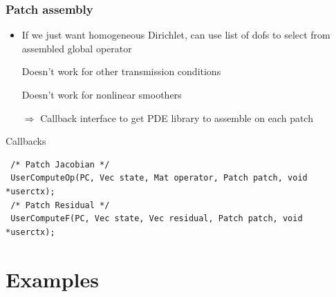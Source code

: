 \documentclass[presentation,aspectratio=43, 10pt]{beamer}
\newcommand{\xmark}{\ding{55}}
\begin{document}
\begin{frame}[fragile]
  \frametitle{Patch assembly}
  \begin{itemize}
  \item If we just want homogeneous Dirichlet, can use list of dofs to
    select from assembled global operator
  \item[\xmark] Doesn't work for other transmission conditions
  \item[\xmark] Doesn't work for nonlinear smoothers
  \item[$\Rightarrow$] Callback interface to get PDE library to
    assemble on each patch
  \end{itemize}
  \begin{block}{Callbacks}
\begin{verbatim}
 /* Patch Jacobian */
 UserComputeOp(PC, Vec state, Mat operator, Patch patch, void *userctx);
 /* Patch Residual */
 UserComputeF(PC, Vec state, Vec residual, Patch patch, void *userctx);
\end{verbatim}
  \end{block}
\end{frame}

\section{Examples}
\end{document}
